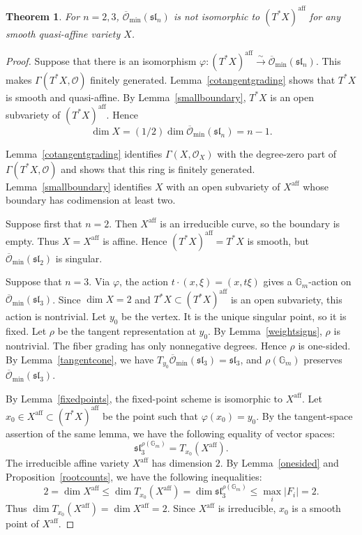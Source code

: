 \documentclass[10pt,a4paper]{amsart}
\newtheorem{theorem}{Theorem}[section]
\newcommand{\Gm}{\mathbb G_m}
\newcommand{\OO}{\mathcal O}
\newcommand{\Ominbar}{\overline{\mathcal O}_{\min}}
\newcommand{\aff}{\mathrm{aff}}
\begin{document}
\begin{theorem}\label{smalltypes}
    For $n=2,3$, $\Ominbar(\mathfrak{sl}_n)$ is not isomorphic to $(T^*X)^\aff$ for any smooth quasi-affine variety $X$.
\end{theorem}
\begin{proof}
    Suppose that there is an isomorphism $\varphi:(T^*X)^\aff\xrightarrow{\sim}\Ominbar(\mathfrak{sl}_n)$. This makes $\Gamma(T^*X,\OO)$ finitely generated. Lemma~\ref{cotangentgrading} shows that $T^*X$ is smooth and quasi-affine. By Lemma~\ref{smallboundary}, $T^*X$ is an open subvariety of $(T^*X)^\aff$. Hence $$\dim X=(1/2)\dim \Ominbar(\mathfrak{sl}_n)=n-1.$$

    Lemma~\ref{cotangentgrading} identifies $\Gamma(X,\OO_X)$ with the degree-zero part of $\Gamma(T^*X,\OO)$ and shows that this ring is finitely generated. Lemma~\ref{smallboundary} identifies $X$ with an open subvariety of $X^\aff$ whose boundary has codimension at least two.

    Suppose first that $n=2$. Then $X^\aff$ is an irreducible curve, so the boundary is empty. Thus $X=X^\aff$ is affine. Hence $(T^*X)^\aff=T^*X$ is smooth, but $\Ominbar(\mathfrak{sl}_2)$ is singular.

    Suppose that $n=3$. Via $\varphi$, the action $t\cdot(x,\xi)=(x,t\xi)$ gives a $\Gm$-action on $\Ominbar(\mathfrak{sl}_3)$. Since $\dim X=2$ and $T^*X\subset(T^*X)^\aff$ is an open subvariety, this action is nontrivial. Let $y_0$ be the vertex. It is the unique singular point, so it is fixed. Let $\rho$ be the tangent representation at $y_0$. By Lemma~\ref{weightsigns}, $\rho$ is nontrivial. The fiber grading has only nonnegative degrees. Hence $\rho$ is one-sided. By Lemma~\ref{tangentcone}, we have $T_{y_0}\Ominbar(\mathfrak{sl}_3)=\mathfrak{sl}_3$, and $\rho(\Gm)$ preserves $\Ominbar(\mathfrak{sl}_3)$.

    By Lemma~\ref{fixedpoints}, the fixed-point scheme is isomorphic to $X^\aff$. Let $x_0\in X^\aff\subset(T^*X)^\aff$ be the point such that $\varphi(x_0)=y_0$. By the tangent-space assertion of the same lemma, we have the following equality of vector spaces:
    \[
        \mathfrak{sl}_3^{\rho(\Gm)}=T_{x_0}(X^\aff).
    \]
    The irreducible affine variety $X^\aff$ has dimension $2$. By Lemma~\ref{onesided} and Proposition~\ref{rootcounts}, we have the following inequalities:
    \[
        2=\dim X^\aff\le\dim T_{x_0}(X^\aff)
        =\dim\mathfrak{sl}_3^{\rho(\Gm)}
        \le\max_i|F_i|=2.
    \]
    Thus $\dim T_{x_0}(X^\aff)=\dim X^\aff=2$. Since $X^\aff$ is irreducible, $x_0$ is a smooth point of $X^\aff$.


\end{proof}
\end{document}

